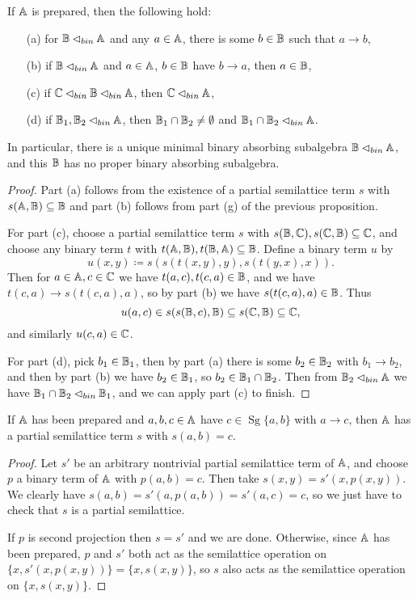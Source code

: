 \documentclass[letterpaper,11pt]{article}
\DeclareMathOperator{\Sg}{Sg}
\begin{document}
\begin{prop}\label{prepared-bin-abs} If $\mathbb{A}$ is prepared, then the following hold:
\begin{itemize}
\item[(a)] for $\mathbb{B} \lhd_{bin} \mathbb{A}$ and any $a \in \mathbb{A}$, there is some $b \in \mathbb{B}$ such that $a \rightarrow b$,
\item[(b)] if $\mathbb{B} \lhd_{bin} \mathbb{A}$ and $a \in \mathbb{A}$, $b \in \mathbb{B}$ have $b \rightarrow a$, then $a \in \mathbb{B}$,
\item[(c)] if $\mathbb{C} \lhd_{bin} \mathbb{B} \lhd_{bin} \mathbb{A}$, then $\mathbb{C} \lhd_{bin} \mathbb{A}$,
\item[(d)] if $\mathbb{B}_1, \mathbb{B}_2 \lhd_{bin} \mathbb{A}$, then $\mathbb{B}_1 \cap \mathbb{B}_2 \ne \emptyset$ and $\mathbb{B}_1 \cap \mathbb{B}_2 \lhd_{bin} \mathbb{A}$.
\end{itemize}
In particular, there is a unique minimal binary absorbing subalgebra $\mathbb{B} \lhd_{bin} \mathbb{A}$, and this $\mathbb{B}$ has no proper binary absorbing subalgebra.
\end{prop}
\begin{proof} Part (a) follows from the existence of a partial semilattice term $s$ with $s(\mathbb{A},\mathbb{B}) \subseteq \mathbb{B}$ and part (b) follows from part (g) of the previous proposition.

For part (c), choose a partial semilattice term $s$ with $s(\mathbb{B},\mathbb{C}), s(\mathbb{C},\mathbb{B}) \subseteq \mathbb{C}$, and choose any binary term $t$ with $t(\mathbb{A},\mathbb{B}), t(\mathbb{B},\mathbb{A}) \subseteq \mathbb{B}$. Define a binary term $u$ by
\[
u(x,y) \coloneqq s(s(t(x,y),y),s(t(y,x),x)).
\]
Then for $a \in \mathbb{A}, c \in \mathbb{C}$ we have $t(a,c), t(c,a) \in \mathbb{B}$, and we have $t(c,a) \rightarrow s(t(c,a),a)$, so by part (b) we have $s(t(c,a),a) \in \mathbb{B}$. Thus
\[
u(a,c) \in s(s(\mathbb{B},c),\mathbb{B}) \subseteq s(\mathbb{C},\mathbb{B}) \subseteq \mathbb{C},
\]
and similarly $u(c,a) \in \mathbb{C}$.

For part (d), pick $b_1 \in \mathbb{B}_1$, then by part (a) there is some $b_2 \in \mathbb{B}_2$ with $b_1 \rightarrow b_2$, and then by part (b) we have $b_2 \in \mathbb{B}_1$, so $b_2 \in \mathbb{B}_1 \cap \mathbb{B}_2$. Then from $\mathbb{B}_2 \lhd_{bin} \mathbb{A}$ we have $\mathbb{B}_1 \cap \mathbb{B}_2 \lhd_{bin} \mathbb{B}_1$, and we can apply part (c) to finish.
\end{proof}

\begin{prop}\label{arrow-partial} If $\mathbb{A}$ has been prepared and $a,b,c \in \mathbb{A}$ have $c \in \Sg\{a,b\}$ with $a \rightarrow c$, then $\mathbb{A}$ has a partial semilattice term $s$ with $s(a,b) = c$.
\end{prop}
\begin{proof} Let $s'$ be an arbitrary nontrivial partial semilattice term of $\mathbb{A}$, and choose $p$ a binary term of $\mathbb{A}$ with $p(a,b) = c$. Then take $s(x,y) = s'(x,p(x,y))$. We clearly have $s(a,b) = s'(a,p(a,b)) = s'(a,c) = c$, so we just have to check that $s$ is a partial semilattice.

If $p$ is second projection then $s = s'$ and we are done. Otherwise, since $\mathbb{A}$ has been prepared, $p$ and $s'$ both act as the semilattice operation on $\{x,s'(x,p(x,y))\} = \{x,s(x,y)\}$, so $s$ also acts as the semilattice operation on $\{x,s(x,y)\}$.
\end{proof}
\end{document}
